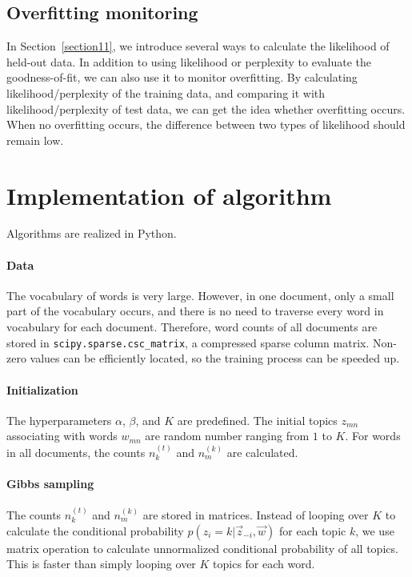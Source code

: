 \documentclass{article} %
\begin{document}
\subsection{Overfitting monitoring}
In Section~\ref{section11}, we introduce several ways to calculate the likelihood of held-out data. In addition to using likelihood or perplexity to evaluate the goodness-of-fit, we can also use it to monitor overfitting. By calculating likelihood/perplexity of the training data, and comparing it with likelihood/perplexity of test data, we can get the idea whether overfitting occurs. When no overfitting occurs, the difference between two types of likelihood should remain low.


\section{Implementation of algorithm}
Algorithms are realized in Python.
\paragraph{Data} \hspace{0pt} The vocabulary of words is very large. However, in one document, only a small part of the vocabulary occurs, and there is no need to traverse every word in vocabulary for each document. Therefore, word counts of all documents are stored in \texttt{scipy.sparse.csc\_matrix}, a compressed sparse column matrix. Non-zero values can be efficiently located, so the training process can be speeded up.
\paragraph{Initialization} \hspace{0pt} The hyperparameters $\alpha$, $\beta$, and $K$ are predefined. The initial topics $z_{mn}$ associating with words $w_{mn}$ are random number ranging from $1$ to $K$. For words in all documents, the counts $n^{(t)}_{k}$ and $n^{(k)}_{m}$ are calculated. 
\paragraph{Gibbs sampling} \hspace{0pt} The counts $n^{(t)}_{k}$ and $n^{(k)}_{m}$ are stored in matrices. Instead of looping over $K$ to calculate the conditional probability $p(z_{i}=k|\vec{z}_{-i}, \vec{w})$ for each topic $k$, we use matrix operation to calculate unnormalized conditional probability of all topics. This is faster than simply looping over $K$ topics for each word.
\end{document}
